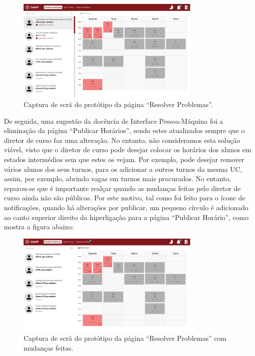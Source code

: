 \documentclass[12pt, a4paper]{article}
\begin{document}
\begin{figure}[H]
    \centering
    \includegraphics[width=0.8\textwidth]{res/prototype/resolver-problemas-revisto.png}
    \caption{Captura de ecrã do protótipo da página ``Resolver Problemas''.}
    \label{resolver-problemas-revisto}
\end{figure}

De seguida, uma sugestão da docência de Interface Pessoa-Máquina foi a eliminação da página
``Publicar Horários'', sendo estes atualizados sempre que o diretor de curso faz uma alteração. No
entanto, não consideramos esta solução viável, visto que o diretor de curso pode desejar colocar os
horários dos alunos em estados intermédios sem que estes os vejam. Por exemplo, pode desejar remover
vários alunos dos seus turnos, para os adicionar a outros turnos da mesma UC, assim, por exemplo,
abrindo vagas em turnos mais procurados. No entanto, reparou-se que é importante realçar quando as
mudanças feitas pelo diretor de curso ainda não são públicas. Por este motivo, tal como foi feito
para o ícone de notificações, quando há alterações por publicar, um pequeno círculo é adicionado ao
canto superior direito da hiperligação para a página ``Publicar Horário'', como mostra a figura
abaixo:

\begin{figure}[H]
    \centering
    \includegraphics[width=0.8\textwidth]{res/prototype/mudancas-feitas-publicar-horario.png}
    \caption{Captura de ecrã do protótipo da página ``Resolver Problemas'' com mudanças feitas.}
    \label{mudancas-feitas-publicar-horario}
\end{figure}
\end{document}
